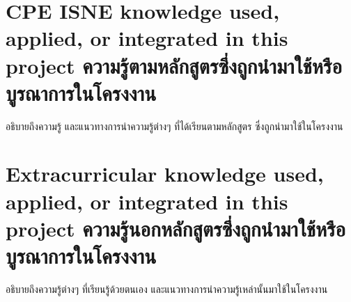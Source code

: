 \section{\ifenglish%
\ifcpe CPE \else ISNE \fi knowledge used, applied, or integrated in this project
\else%
ความรู้ตามหลักสูตรซึ่งถูกนำมาใช้หรือบูรณาการในโครงงาน
\fi
}

อธิบายถึงความรู้ และแนวทางการนำความรู้ต่างๆ ที่ได้เรียนตามหลักสูตร ซึ่งถูกนำมาใช้ในโครงงาน

\section{\ifenglish%
Extracurricular knowledge used, applied, or integrated in this project
\else%
ความรู้นอกหลักสูตรซึ่งถูกนำมาใช้หรือบูรณาการในโครงงาน
\fi
}

อธิบายถึงความรู้ต่างๆ ที่เรียนรู้ด้วยตนเอง และแนวทางการนำความรู้เหล่านั้นมาใช้ในโครงงาน
